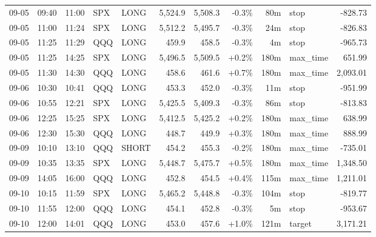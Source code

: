 \documentclass[11pt,a4paper,twoside]{article}
\begin{document}
\begin{center}
\begin{longtable}{>{\color{txtmain}}l l l l l r r r r >{\color{txtmain}}l r}
09-05 & 09:40 & 11:00 & SPX & LONG & 5,524.9 & 5,508.3 & \textcolor{lossred}{-0.3\%} & 80m & stop & \textcolor{lossred}{-828.73} \\
09-05 & 11:00 & 11:24 & SPX & LONG & 5,512.2 & 5,495.7 & \textcolor{lossred}{-0.3\%} & 24m & stop & \textcolor{lossred}{-826.83} \\
09-05 & 11:25 & 11:29 & QQQ & LONG & 459.9 & 458.5 & \textcolor{lossred}{-0.3\%} & 4m & stop & \textcolor{lossred}{-965.73} \\
09-05 & 11:25 & 14:25 & SPX & LONG & 5,496.5 & 5,509.5 & \textcolor{wingreen}{+0.2\%} & 180m & max\_time & \textcolor{wingreen}{651.99} \\
09-05 & 11:30 & 14:30 & QQQ & LONG & 458.6 & 461.6 & \textcolor{wingreen}{+0.7\%} & 180m & max\_time & \textcolor{wingreen}{2,093.01} \\
09-06 & 10:30 & 10:41 & QQQ & LONG & 453.3 & 452.0 & \textcolor{lossred}{-0.3\%} & 11m & stop & \textcolor{lossred}{-951.99} \\
09-06 & 10:55 & 12:21 & SPX & LONG & 5,425.5 & 5,409.3 & \textcolor{lossred}{-0.3\%} & 86m & stop & \textcolor{lossred}{-813.83} \\
09-06 & 12:25 & 15:25 & SPX & LONG & 5,412.5 & 5,425.2 & \textcolor{wingreen}{+0.2\%} & 180m & max\_time & \textcolor{wingreen}{638.99} \\
09-06 & 12:30 & 15:30 & QQQ & LONG & 448.7 & 449.9 & \textcolor{wingreen}{+0.3\%} & 180m & max\_time & \textcolor{wingreen}{888.99} \\
09-09 & 10:10 & 13:10 & QQQ & SHORT & 454.2 & 455.3 & \textcolor{lossred}{-0.2\%} & 180m & max\_time & \textcolor{lossred}{-735.01} \\
09-09 & 10:35 & 13:35 & SPX & LONG & 5,448.7 & 5,475.7 & \textcolor{wingreen}{+0.5\%} & 180m & max\_time & \textcolor{wingreen}{1,348.50} \\
09-09 & 14:05 & 16:00 & QQQ & LONG & 452.8 & 454.5 & \textcolor{wingreen}{+0.4\%} & 115m & max\_time & \textcolor{wingreen}{1,211.01} \\
09-10 & 10:15 & 11:59 & SPX & LONG & 5,465.2 & 5,448.8 & \textcolor{lossred}{-0.3\%} & 104m & stop & \textcolor{lossred}{-819.77} \\
09-10 & 11:55 & 12:00 & QQQ & LONG & 454.1 & 452.8 & \textcolor{lossred}{-0.3\%} & 5m & stop & \textcolor{lossred}{-953.67} \\
09-10 & 12:00 & 14:01 & QQQ & LONG & 453.0 & 457.6 & \textcolor{wingreen}{+1.0\%} & 121m & target & \textcolor{wingreen}{3,171.21} \\

\end{longtable}
\end{center}
\end{document}
